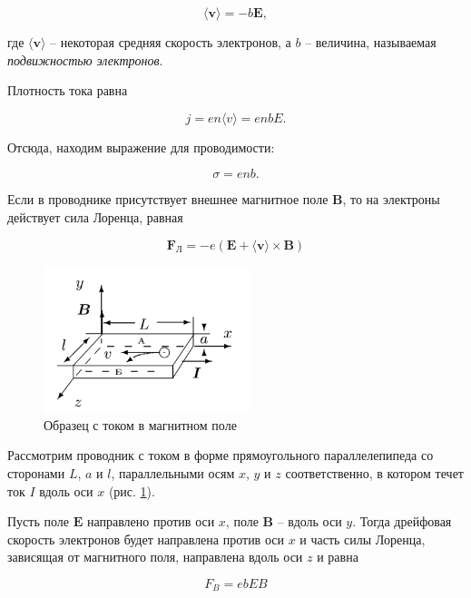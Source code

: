 \documentclass[a4paper, 12pt]{article}
\begin{document}
    \begin{equation}
        \langle \bm{v} \rangle = -b \bm{E},
    \end{equation}

    где $\langle \bm{v} \rangle$ -- некоторая средняя скорость электронов, а $b$ -- величина, называемая \textit{подвижностью электронов}.

    Плотность тока равна

    \begin{equation}
        j = e n \langle v \rangle = enbE.
    \end{equation}

    Отсюда, находим выражение для проводимости:

    \begin{equation}
        \sigma = enb.
    \end{equation}

    Если в проводнике присутствует внешнее магнитное поле $\bm{B}$, то на электроны действует сила Лоренца, равная

    \begin{equation}
        \bm{F_\text{Л}} = -e \left( \bm{E} + \langle \bm{v} \rangle \times \bm{B} \right)
    \end{equation}

     \begin{figure}
	\includegraphics[width=6cm]{images/theor.png}
	\caption{Образец с током в магнитном поле}
	\label{theor}
    \end{figure}

    Рассмотрим проводник с током в форме прямоугольного параллелепипеда со сторонами $L$, $a$ и $l$, параллельными осям $x$, $y$ и $z$ соответственно, в котором течет ток $I$ вдоль оси $x$ (рис. \ref{theor}).

    Пусть поле $\bm{E}$ направлено против оси $x$, поле $\bm{B}$ -- вдоль оси $y$. Тогда дрейфовая скорость электронов будет направлена против оси $x$ и часть силы Лоренца, зависящая от магнитного поля, направлена вдоль оси $z$ и равна

    \begin{equation}
        F_B = ebEB
    \end{equation}
\end{document}
